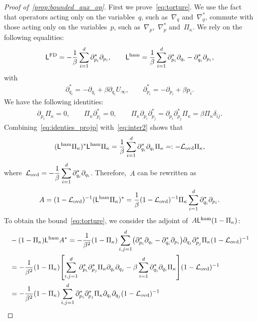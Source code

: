 \documentclass[onefignum,onetabnum]{siamart251216} %
\newcommand{\mc}[1]{\mathcal{#1}}
\newcommand{\projvit}{\Pi_{\kappa}}
\newcommand{\Lham}{\mathsf{L}^{\rm{ham}}}
\newcommand{\LFD}{\mathsf{L}^{\rm{FD}}}
\newcommand{\Lovd}{\mc{L}_{\rm{ovd}}}
\theoremstyle{plain}
\numberwithin{equation}{section}
\numberwithin{theorem}{section}
\begin{document}
\fi
\begin{proof}[{Proof of~\cref{prop:bounded_aux_op}}]
First we prove~\eqref{eq:torture}. We use the fact that operators acting only on the variables~$q$, such as~$\nabla_q$ and~$\nabla_q^*$, commute with those acting only on the variables~$p$, such as~$\nabla_p$,~$\nabla_p^*$ and~$\projvit$.
We rely on the following equalities:
\begin{align*}
    \LFD = -\frac1\beta\sum_{i=1}^{d}\partial^*_{p_i}\partial_{p_i},\qquad \Lham = \frac1\beta\sum_{i=1}^{d}\partial^*_{p_i}\partial_{q_i} - \partial^*_{q_i}\partial_{p_i},
\end{align*}
with
\begin{align*}
    \partial_{q_i}^* = -\partial_{q_i} + \beta \partial_{q_i}U_\infty ,\qquad \partial_{p_i}^* = -\partial_{p_i} + \beta p_i.
\end{align*}
We have the following identities:
\begin{align}
    \label{eq:identies_projp}
    \partial_{p_i}\projvit = 0,\qquad\projvit\partial_{p_i}^*=0,\qquad\projvit\partial_{p_i}\partial_{p_j}^* = \partial_{p_i}\partial_{p_j}^*\projvit = \beta\projvit \delta_{ij}.
\end{align}
Combining~\eqref{eq:identies_projp} with~\eqref{eq:inter2} shows that
\begin{align*}
    (\Lham\projvit)^*\Lham\projvit = \frac1\beta \sum_{i=1}^{d}\partial_{q_i}^* \partial_{q_i} \projvit=:-\Lovd\projvit,
\end{align*}
where~$\Lovd = -\displaystyle\frac{1}{\beta}\sum_{i=1}^{d}\partial_{q_i}^*\partial_{q_i}$.
Therefore,~$A$ can be rewritten as
\begin{align*}
    A = (1-\Lovd)^{-1}(\Lham\projvit)^* = \frac1\beta (1-\Lovd)^{-1}\projvit\sum_{i=1}^{d}\partial^*_{q_i}\partial_{p_i}.
\end{align*}
To obtain the bound~\eqref{eq:torture}, we consider the adjoint of~$A\Lham(1-\projvit)$:
\begin{align*}
    &-(1-\projvit)\Lham A^* = -\frac{1}{\beta^2}(1-\projvit)\sum_{i,j=1}^{d}\!\left(\partial^*_{p_i}\partial_{q_i} - \partial^*_{q_i}\partial_{p_i}\right)\!\partial_{q_j}\partial_{p_j}^*\projvit(1-\Lovd)^{-1} \\
    & = -\frac{1}{\beta^2}(1-\projvit)\!\left[\sum_{i,j=1}^{d}\partial^*_{p_i}\partial^*_{p_j}\projvit\partial_{q_i}\partial_{q_j} - \beta \sum_{i=1}^{d}\partial^*_{q_i}\partial_{q_i}\projvit \right]\!(1-\Lovd)^{-1} \\
    & =-\frac{1}{\beta^2}(1-\projvit)\sum_{i,j=1}^{d}\partial^*_{p_i}\partial^*_{p_j}\projvit\partial_{q_i}\partial_{q_j} (1-\Lovd)^{-1} \\

\end{align*}
\end{proof}
\end{document}
